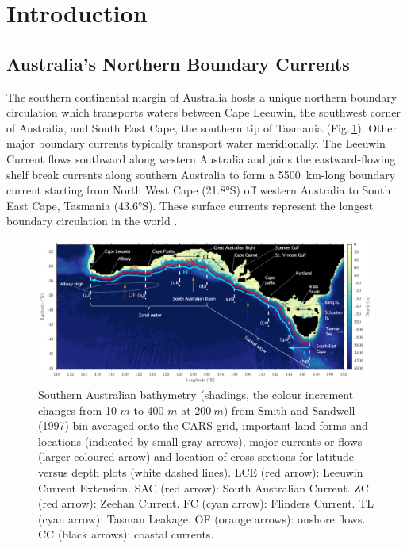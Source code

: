 \documentclass[preprint,3p,review,12pt]{elsarticle}
\begin{document}
\linenumbers

\section{Introduction} \label{Introduction}
\subsection{Australia's Northern Boundary Currents} \label{Australia's Northern Boundary Currents}
The southern continental margin of Australia hosts a unique northern boundary circulation which transports waters between Cape Leeuwin, the southwest corner of Australia, and South East Cape, the southern tip of Tasmania (Fig.\,\ref{f01_fig1_}). Other major boundary currents typically transport water meridionally. The Leeuwin Current flows southward along western Australia and joins the eastward-flowing shelf break currents along southern Australia to form a \SI{5500}{km}-long boundary current starting from North West Cape (\ang{21.8}S) off western Australia to South East Cape, Tasmania (\ang{43.6}S). These surface currents represent the longest boundary circulation in the world \citep{Middleton2007,Ridgway2004}.
%
\begin{figure}[h]
\noindent\includegraphics[width=1\textwidth, height=0.89\textheight, keepaspectratio]
{f01_fig1_.png}
\caption{\label{f01_fig1_}%
  Southern Australian bathymetry (shadings, the colour increment changes from 10 $m$ to 400 $m$ at $200\ m$) from Smith and Sandwell (1997) bin averaged onto the CARS grid, important land forms and locations (indicated by small gray arrows), major currents or flows (larger coloured arrow) and location of cross-sections for latitude versus depth plots (white dashed lines). LCE (red arrow): Leeuwin Current Extension. SAC (red arrow): South Australian Current. ZC (red arrow): Zeehan Current. FC (cyan arrow): Flinders Current. TL (cyan arrow): Tasman Leakage. OF (orange arrows): onshore flows. CC (black arrows): coastal currents.}
\end{figure}
\end{document}
